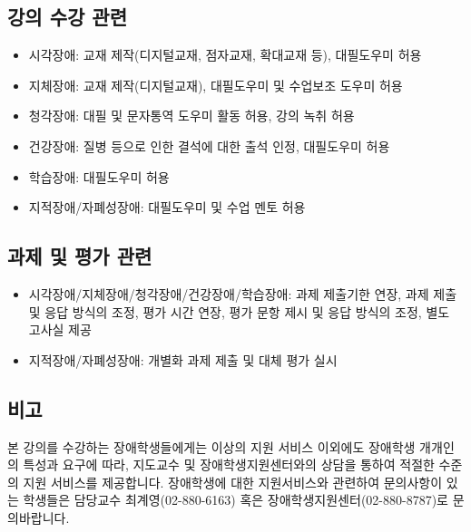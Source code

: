 \documentclass{article}
\begin{document}
\subsection{강의 수강 관련}
\medskip
\begin{itemize}
    \item 시각장애: 교재 제작(디지털교재, 점자교재, 확대교재 등), 대필도우미 허용
    \item 지체장애: 교재 제작(디지털교재), 대필도우미 및 수업보조 도우미 허용
    \item 청각장애: 대필 및 문자통역 도우미 활동 허용, 강의 녹취 허용
    \item 건강장애: 질병 등으로 인한 결석에 대한 출석 인정, 대필도우미 허용
    \item 학습장애: 대필도우미 허용
    \item 지적장애/자폐성장애: 대필도우미 및 수업 멘토 허용
\end{itemize}
\subsection{과제 및 평가 관련}
\medskip
\begin{itemize}
    \item 시각장애/지체장애/청각장애/건강장애/학습장애: 과제 제출기한 연장, 과제 제출 및 응답 방식의 조정, 평가 시간 연장, 평가 문항 제시 및 응답 방식의 조정, 별도 고사실 제공
    \item 지적장애/자폐성장애: 개별화 과제 제출 및 대체 평가 실시
\end{itemize}
\subsection{비고}
\medskip
본 강의를 수강하는 장애학생들에게는 이상의 지원 서비스 이외에도 장애학생 개개인의 특성과 요구에 따라, 지도교수 및 장애학생지원센터와의 상담을 통하여 적절한 수준의 지원 서비스를 제공합니다. 장애학생에 대한 지원서비스와 관련하여 문의사항이 있는 학생들은 담당교수 최계영(02-880-6163) 혹은 장애학생지원센터(02-880-8787)로 문의바랍니다.
\end{document}
